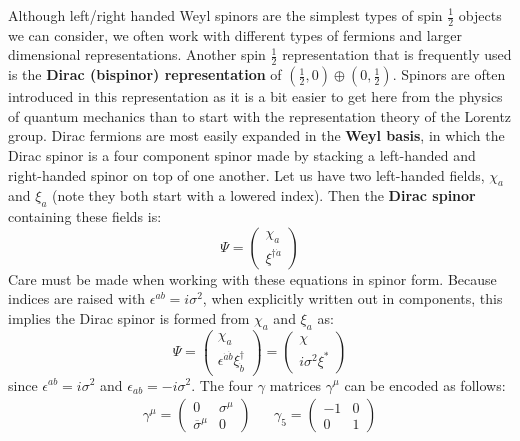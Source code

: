\documentclass[11pt, oneside]{article}   	%
\theoremstyle{definition}
\begin{document}
Although left/right handed Weyl spinors are the simplest types of spin $\frac{1}{2}$ objects we can consider, we often work with different 
types of fermions and larger dimensional representations. Another spin $\frac{1}{2}$ representation that is frequently used is the \textbf{Dirac 
(bispinor) representation} of $(\frac{1}{2}, 0)\oplus (0, \frac{1}{2})$. Spinors are often introduced in this representation as it is a bit easier to get 
here from the physics of quantum mechanics than to start with the representation theory of the Lorentz group. 
Dirac fermions are most easily expanded in the \textbf{Weyl basis}, in which the Dirac spinor is a four component spinor made by 
stacking a left-handed and right-handed spinor on top of one another. Let us have two left-handed fields, $\chi_a$ and $\xi_a$ (note they 
both start with a lowered index). Then the \textbf{Dirac spinor} containing these fields is:
\begin{equation}
	\Psi = \begin{pmatrix}
		\chi_a \\ 
		\xi^{\dagger\dot a}
	\end{pmatrix}
\end{equation}
Care must be made when working with these equations in spinor form. Because indices are raised with $\epsilon^{ab} = i\sigma^2$, when 
explicitly written out in components, this implies the Dirac spinor is formed from $\chi_a$ and $\xi_a$ as:
\begin{equation}
	\Psi
	= \begin{pmatrix} 
		\chi_a \\
		\epsilon^{\dot a\dot b} \xi^\dagger_{\dot b}
	\end{pmatrix}
	= \begin{pmatrix} 
		\chi \\
		i\sigma^2 \xi^*
	\end{pmatrix}
\end{equation}
since $\epsilon^{ab} = i\sigma^2$ and $\epsilon_{ab} = -i\sigma^2$. The four $\gamma$ matrices $\gamma^\mu$ can be encoded as follows:
\begin{align}
	\gamma^\mu = \begin{pmatrix} 0 & \sigma^\mu \\ \overline\sigma^\mu & 0 \end{pmatrix} && 
	\gamma_5 = \begin{pmatrix} -1 & 0 \\ 0 & 1 \end{pmatrix}
\end{align}
\end{document}
